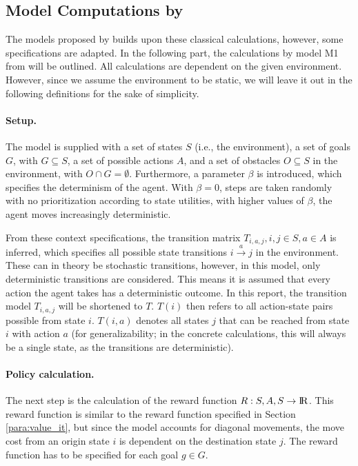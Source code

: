 \subsection{Model Computations by }\label{subsec:models}

The models proposed by  builds upon these classical calculations, however, some specifications are adapted. In the following part, the calculations by model M1 from  will be outlined. All calculations are dependent on the given environment. However, since we assume the environment to be static, we will leave it out in the following definitions for the sake of simplicity.

\paragraph{Setup.}
The model is supplied with a set of states $S$ (i.e., the environment), a set of goals $G$, with $G \subseteq S$, a set of possible actions $A$, and a set of obstacles $O \subseteq S$ in the environment, with $O \cap  G = \emptyset$. Furthermore, a parameter $\beta$ is introduced, which specifies the determinism of the agent. With $\beta=0$, steps are taken randomly with no prioritization according to state utilities, with higher values of $\beta$, the agent moves increasingly deterministic.

From these context specifications, the transition matrix $T_{i,a,j}, i,j \in S, a \in A$ is inferred, which specifies all possible state transitions $i \overset{a}{\rightarrow} j$ in the environment. These can in theory be stochastic transitions, however, in this model, only deterministic transitions are considered. This means it is assumed that every action the agent takes has a deterministic outcome.
In this report, the transition model $T_{i,a,j}$ will be shortened to $T$. $T(i)$ then refers to all action-state pairs possible from state $i$. $T(i,a)$ denotes all states $j$ that can be reached from state $i$ with action $a$ (for generalizability; in the concrete calculations, this will always be a single state, as the transitions are deterministic).

\paragraph{Policy calculation.}
The next step is the calculation of the reward function $R: {S,A,S} \rightarrow  {\rm I\!R}$. This reward function is similar to the reward function specified in Section \ref{para:value_it}, but since the model accounts for diagonal movements, the move cost from an origin state $i$ is dependent on the destination state $j$. The reward function has to be specified for each goal $g \in G$.

